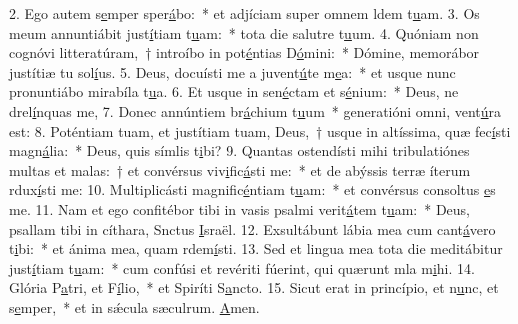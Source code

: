 2. Ego autem s\uline{e}mper sper\uline{á}bo:~* et adjíciam super omnem ldem t\uline{u}am.
3. Os meum annuntiábit just\uline{í}tiam t\uline{u}am:~* tota die salutre t\uline{u}um.
4. Quóniam non cognóvi litteratúram,~† introíbo in pot\uline{é}ntias D\uline{ó}mini:~* Dómine, memorábor justítiæ tu sol\uline{í}us.
5. Deus, docuísti me a juvent\uline{ú}te m\uline{e}a:~* et usque nunc pronuntiábo mirabíla t\uline{u}a.
6. Et usque in sen\uline{é}ctam et s\uline{é}nium:~* Deus, ne drel\uline{í}nquas me,
7. Donec annúntiem br\uline{á}chium t\uline{u}um~* generatióni omni,  vent\uline{ú}ra est:
8. Poténtiam tuam, et justítiam tuam, Deus,~† usque in altíssima, quæ fec\uline{í}sti magn\uline{á}lia:~* Deus, quis símlis t\uline{i}bi?
9. Quantas ostendísti mihi tribulatiónes multas et malas:~† et convérsus viv\uline{i}fic\uline{á}sti me:~* et de abýssis terræ íterum rdux\uline{í}sti me:
10. Multiplicásti magnific\uline{é}ntiam t\uline{u}am:~* et convérsus consoltus \uline{e}s me.
11. Nam et ego confitébor tibi in vasis psalmi verit\uline{á}tem t\uline{u}am:~* Deus, psallam tibi in cíthara, Snctus \uline{I}sraël.
12. Exsultábunt lábia mea cum cant\uline{á}vero t\uline{i}bi:~* et ánima mea, quam rdem\uline{í}sti.
13. Sed et lingua mea tota die meditábitur just\uline{í}tiam t\uline{u}am:~* cum confúsi et revériti fúerint, qui quærunt mla m\uline{i}hi.
14. Glória P\uline{a}tri, et F\uline{í}lio,~* et Spiríti S\uline{a}ncto.
15. Sicut erat in princípio, et n\uline{u}nc, et s\uline{e}mper,~* et in sǽcula sæculrum. \uline{A}men.
